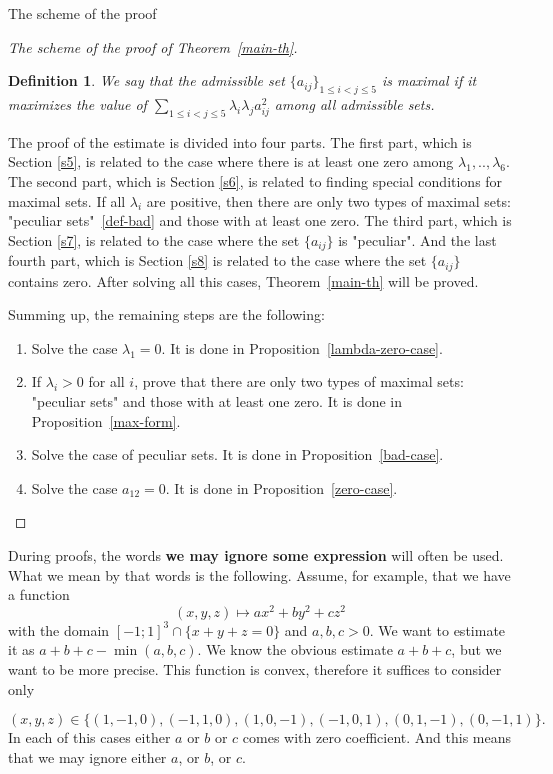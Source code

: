 \documentclass[12pt]{article}
\newtheorem{definition}{Definition}[section]
\begin{document}
\begin{section}{The scheme of the proof}
\begin{proof}[The scheme of the proof of Theorem~\ref{main-th}]
\begin{definition}
    We say that the admissible set  $\{a_{ij}\}_{1\leq i<j\leq 5}$ is maximal if it maximizes the value of  $\sum_{1\leq i<j\leq 5}\lambda_{i}\lambda_{j}a_{ij}^2$ among all admissible sets.
\end{definition}

The proof of the estimate is divided into four parts. The first part, which is Section \ref{s5}, is related to the case where there is at least one zero among $\lambda_{1},..,\lambda_{6}.$ The second part, which is Section \ref{s6}, is related to finding special conditions for maximal sets. If all $\lambda_{i}$ are positive, then there are only two types of maximal sets: "peculiar sets"~\ref{def-bad} and those with at least one zero. The third part, which is Section \ref{s7}, is related to the case where the set $\{a_{ij}\}$ is "peculiar". And the last fourth part, which is Section \ref{s8} is related to the case where the set $\{a_{ij}\}$ contains zero.  After solving all this cases, Theorem~\ref{main-th} will be proved. 

Summing up, the remaining steps are the following:

\begin{enumerate}
    \item Solve the case $\lambda_{1}=0.$ It is done in Proposition~\ref{lambda-zero-case}.
    \item If $\lambda_{i}>0$ for all $i$, prove that there are only two types of maximal sets: "peculiar sets" and those with at least one zero. It is done in Proposition~\ref{max-form}. 
    \item Solve the case of peculiar sets. It is done in Proposition~\ref{bad-case}.
    \item Solve the case  $a_{12}=0$. It is done in Proposition~\ref{zero-case}.
    
\end{enumerate}
\end{proof}


    During proofs, the words \textbf{we may ignore some  expression} will often be used. What we mean by that words is the following. Assume, for example, that we have a function $$(x,y,z)\mapsto ax^2 + by^2 + cz^2$$ with the domain $[-1;1]^{3}\cap \{x+y+z=0\}$ and $a,b,c > 0$. We want to estimate it as $a+b+c - \min(a,b,c).$ We know the obvious estimate $a+b+c$, but we want to be more precise. This function is convex, therefore it suffices to consider only 
    
    $$(x,y,z)\in \{(1,-1,0),(-1,1,0),(1,0,-1),(-1,0,1),(0,1,-1), (0,-1,1)\}.$$  
    In each of this cases either $a$ or $b$ or $c$ comes with zero coefficient. And this means that we may ignore either $a$, or $b$, or $c$. 



\end{section}
\end{document}
